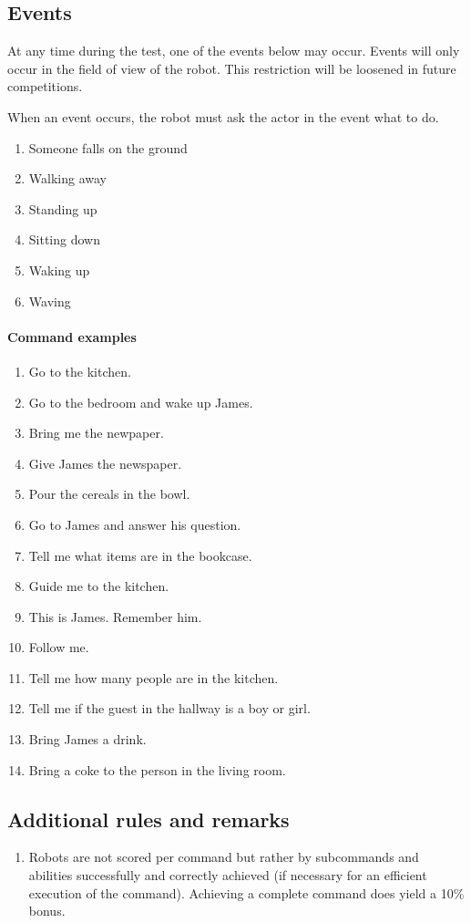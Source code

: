 \subsection{Events}
At any time during the test, one of the events below may occur. 
Events will only occur in the field of view of the robot. 
This restriction will be loosened in future competitions. 

When an event occurs, the robot must ask the actor in the event what to do. 
\begin{enumerate}
 \item Someone falls on the ground
 \item Walking away
 \item Standing up
 \item Sitting down
 \item Waking up
 \item Waving
\end{enumerate}


\paragraph{Command examples}
\begin{enumerate}
 \item Go to the kitchen.
 \item Go to the bedroom and wake up James.
 \item Bring me the newpaper.
 \item Give James the newspaper.
 \item Pour the cereals in the bowl.
 \item Go to James and answer his question.
 \item Tell me what items are in the bookcase.
 \item Guide me to the kitchen.
 \item This is James. Remember him.
 \item Follow me.
 \item Tell me how many people are in the kitchen.
 \item Tell me if the guest in the hallway is a boy or girl.
 \item Bring James a drink.
 \item Bring a coke to the person in the living room.
\end{enumerate}

\subsection{Additional rules and remarks}
\label{sec:eegpsr_remarks}
\begin{enumerate}
  \item Robots are not scored per command but rather by subcommands and abilities successfully and correctly achieved (if necessary for an efficient execution of the command). 
    Achieving a complete command does yield a 10\% bonus. 
\end{enumerate}

